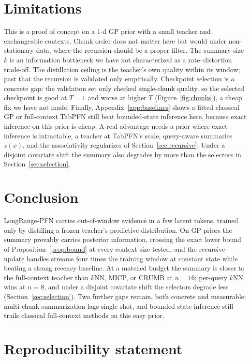 \documentclass{article}
\begin{document}
\section{Limitations}
\label{sec:limitations}

This is a proof of concept on a 1-d GP prior with a small teacher and
exchangeable contexts. Chunk order does not matter here but would under
non-stationary data, where the recursion should be a proper filter. The summary
size $k$ is an information bottleneck we have not characterized as a
rate--distortion trade-off. The distillation ceiling is the teacher's own
quality within its window; past that the recursion is validated only
empirically. Checkpoint selection is a concrete gap: the validation set only
checked single-chunk quality, so the selected checkpoint is good at $T=1$ and
worse at higher $T$ (Figure~\ref{fig:chunks}), a cheap fix we have not made.
Finally, Appendix~\ref{app:baselines} shows a fitted classical GP or
full-context TabPFN still beat bounded-state inference here, because exact
inference on this prior is cheap. A real advantage needs a prior where exact
inference is intractable, a teacher at TabPFN's scale, query-aware summaries
$z(x)$, and the associativity regularizer of Section~\ref{sec:recursive}.
Under a disjoint covariate shift the summary also degrades by more than the
selectors in Section~\ref{sec:selection}.

\section{Conclusion}

LongRange-PFN carries out-of-window evidence in a few latent tokens, trained
only by distilling a frozen teacher's predictive distribution. On GP priors the
summary provably carries posterior information, crossing the exact lower bound
of Proposition~\ref{prop:bound} at every context size tested, and the recursive
update handles streams four times the training window at constant state while
beating a strong recency baseline. At a matched budget the summary is closer
to the full-context teacher than $k$NN, MICP, or CRUMB at $n = 16$; per-query
$k$NN wins at $n = 8$, and under a disjoint covariate shift the selectors
degrade less (Section~\ref{sec:selection}). Two further gaps remain, both
concrete and measurable: multi-chunk summarization lags single-shot, and
bounded-state inference still trails classical full-context methods on this
easy prior.

\section*{Reproducibility statement}
\end{document}
